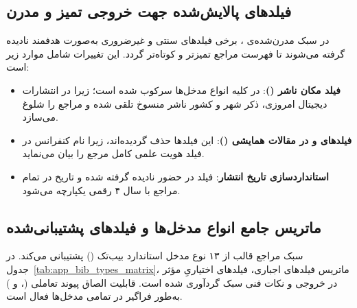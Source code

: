 \subsection{فیلدهای پالایش‌شده جهت خروجی تمیز و مدرن}

در سبک مدرن‌شده‌ی ، برخی فیلدهای سنتی و غیرضروری به‌صورت هدفمند نادیده گرفته می‌شوند تا فهرست مراجع تمیزتر و کوتاه‌تر گردد. این تغییرات شامل موارد زیر است:
\begin{itemize}
    \item \textbf{فیلد مکان ناشر ()}: در کلیه انواع مدخل‌ها سرکوب شده است؛ زیرا در انتشارات دیجیتال امروزی، ذکر شهر و کشور ناشر منسوخ تلقی شده و مراجع را شلوغ می‌سازد.
    \item \textbf{فیلدهای  و  در مقالات همایشی ()}: این فیلدها حذف گردیده‌اند، زیرا نام کنفرانس در فیلد  هویت علمی کامل مرجع را بیان می‌نماید.
    \item \textbf{استانداردسازی تاریخ انتشار}: فیلد  در حضور  نادیده گرفته شده و تاریخ در تمام مراجع با سال ۴ رقمی یکپارچه می‌شود.
\end{itemize}


\subsection{ماتریس جامع انواع مدخل‌ها و فیلدهای پشتیبانی‌شده}

سبک مراجع قالب از ۱۳ نوع مدخل استاندارد بیب‌تک () پشتیبانی می‌کند. در جدول~\ref{tab:app_bib_types_matrix}، ماتریس فیلدهای اجباری، فیلدهای اختیاریِ مؤثر در خروجی و نکات فنی سبک گردآوری شده است. قابلیت الصاق پیوند تعاملی (،  و ) به‌طور فراگیر در تمامی مدخل‌ها فعال است.

